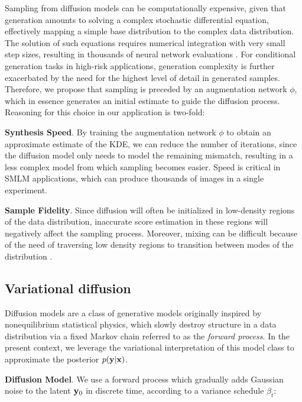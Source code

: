 Sampling from diffusion models can be computationally expensive, given that generation amounts to solving a complex stochastic differential equation, effectively mapping a simple base distribution to the complex data distribution. The solution of such equations requires numerical integration with very small step sizes, resulting in thousands of neural network evaluations \parencite{Saharia2021,Vahdat2021}. For conditional generation tasks in high-risk applications, generation complexity is further exacerbated by the need for the highest level of detail in generated samples. Therefore, we propose that sampling is preceded by an augmentation network $\phi$, which in essence generates an initial estimate to guide the diffusion process. Reasoning for this choice in our application is two-fold:

\textbf{Synthesis Speed}. By training the augmentation network $\phi$ to obtain an approximate estimate of the KDE, we can reduce the number of iterations, since the diffusion model only needs to model the remaining mismatch, resulting in a less complex model from which sampling becomes easier. Speed is critical in SMLM applications, which can produce thousands of images in a single experiment.

\textbf{Sample Fidelity}. Since diffusion will often be initialized in low-density regions of the data distribution, inaccurate score estimation in these regions will negatively affect the sampling process. Moreover, mixing can be difficult because of the need of traversing low density regions to transition between modes of the distribution \parencite{Song2019}.

\subsection{Variational diffusion}

Diffusion models \parencite{Ho2020,Song2021} are a class of generative models originally inspired by nonequilibrium statistical physics, which slowly destroy structure in a data distribution via a fixed Markov chain referred to as the \emph{forward process}. In the present context, we leverage the variational interpretation of this model class \parencite{Kingma2021,Kingma2023} to approximate the posterior $p(\bold{y}\lvert\bold{x})$. 

\textbf{Diffusion Model}. We use a forward process which gradually adds Gaussian noise to the latent $\bold{y}_0$ in discrete time, according to a variance schedule $\beta_{t}$:

